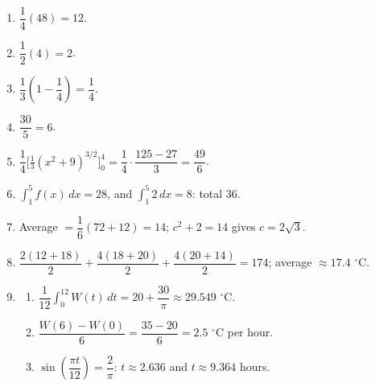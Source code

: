 \documentclass[11pt]{article}
\begin{document}
\newpage
\begin{solbox}
\begin{enumerate}[leftmargin=*,itemsep=4pt]
  \item $\dfrac14(48)=12$.
  \item $\dfrac12(4)=2$.
  \item $\dfrac13\left(1-\dfrac14\right)=\dfrac14$.
  \item $\dfrac{30}{5}=6$.
  \item $\dfrac14\Big[\tfrac13(x^2+9)^{3/2}\Big]_0^4=\dfrac14\cdot\dfrac{125-27}{3}=\dfrac{49}{6}$.
  \item $\displaystyle\int_{1}^{5}f(x)\,dx=28$, and $\displaystyle\int_{1}^{5}2\,dx=8$: total 36.
  \item Average $=\dfrac16(72+12)=14$; $c^2+2=14$ gives $c=2\sqrt3$.
  \item $\dfrac{2(12+18)}{2}+\dfrac{4(18+20)}{2}+\dfrac{4(20+14)}{2}=174$; average $\approx17.4$ $^\circ$C.
  \item \begin{enumerate}[label=(\alph*),leftmargin=*,itemsep=3pt]
    \item $\dfrac{1}{12}\displaystyle\int_{0}^{12}W(t)\,dt=20+\dfrac{30}{\pi}\approx29.549$ $^\circ$C.
    \item $\dfrac{W(6)-W(0)}{6}=\dfrac{35-20}{6}=2.5$ $^\circ$C per hour.
    \item $\sin\!\left(\dfrac{\pi t}{12}\right)=\dfrac2\pi$: $t\approx2.636$ and $t\approx9.364$ hours.
  \end{enumerate}
\end{enumerate}
\end{solbox}
\end{document}
